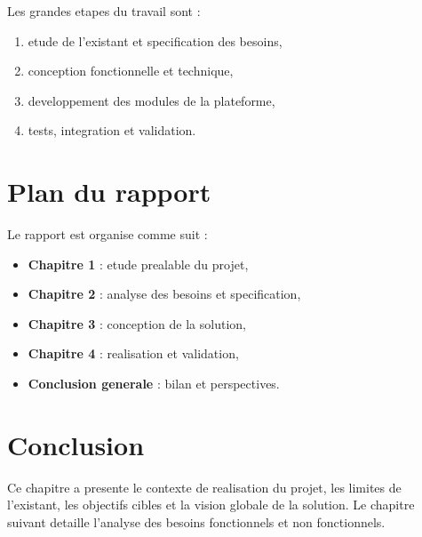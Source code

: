 Les grandes etapes du travail sont :
\begin{enumerate}
    \item etude de l'existant et specification des besoins,
    \item conception fonctionnelle et technique,
    \item developpement des modules de la plateforme,
    \item tests, integration et validation.
\end{enumerate}

\section{Plan du rapport}
Le rapport est organise comme suit :
\begin{itemize}[label=--]
    \item \textbf{Chapitre 1} : etude prealable du projet,
    \item \textbf{Chapitre 2} : analyse des besoins et specification,
    \item \textbf{Chapitre 3} : conception de la solution,
    \item \textbf{Chapitre 4} : realisation et validation,
    \item \textbf{Conclusion generale} : bilan et perspectives.
\end{itemize}

\section{Conclusion}
Ce chapitre a presente le contexte de realisation du projet, les limites de l'existant, les objectifs cibles et la vision globale de la solution. Le chapitre suivant detaille l'analyse des besoins fonctionnels et non fonctionnels.
